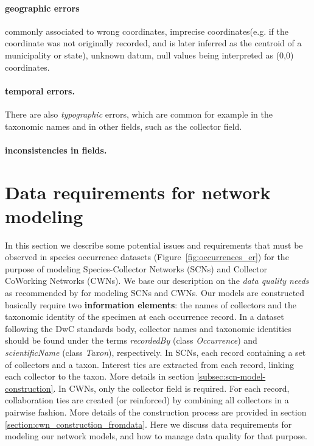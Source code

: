 \paragraph*{geographic errors}commonly associated to 
wrong coordinates, 
imprecise coordinates(e.g. if the coordinate was not originally recorded, and is later inferred as the centroid of a municipality or state), 
unknown datum, 
null values being interpreted as (0,0) coordinates.
%
\paragraph*{temporal errors.}
%
There are also \textit{typographic} errors, which are common for example in the taxonomic names and in other fields, such as the collector field.

\paragraph*{inconsistencies in fields.}




\section{Data requirements for network modeling} %
In this section we describe some potential issues and requirements that must be observed in species occurrence datasets (Figure~\ref{fig:occurrences_er}) for the purpose of modeling Species-Collector Networks (SCNs) and Collector CoWorking Networks (CWNs).
We base our description on the \textit{data quality needs} as recommended by  for modeling SCNs and CWNs.
Our models are constructed basically require two \textbf{information elements}: the names of collectors and the taxonomic identity of the specimen at each occurrence record.
In a dataset following the DwC standards body, collector names and taxonomic identities should be found under the terms \textit{recordedBy} (class \textit{Occurrence}) and \textit{scientificName} (class \textit{Taxon}), respectively.
%
In SCNs, each record containing a set of collectors and a taxon. 
Interest ties are extracted from each record, linking each collector to the taxon.
More details in section \ref{subsec:scn-model-construction}.
%
In CWNs, only the collector field is required.
For each record, collaboration ties are created (or reinforced) by combining all collectors in a pairwise fashion.
More details of the construction process are provided in section \ref{section:cwn_construction_fromdata}.
%
Here we discuss data requirements for modeling our network models, and how to manage data quality for that purpose.

